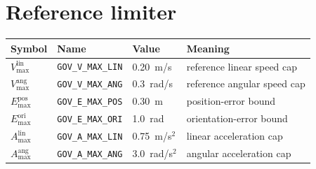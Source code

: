 \documentclass[12pt,a4paper,twoside,openright]{report}
\begin{document}
\section{Reference limiter}
\begin{tabularx}{\linewidth}{@{}lllX@{}}
\toprule
Symbol & Name & Value & Meaning \\
\midrule
$V_{\max}^{\text{lin}}$ & \texttt{GOV\_V\_MAX\_LIN} & 0.20~m/s & reference linear speed cap \\
$V_{\max}^{\text{ang}}$ & \texttt{GOV\_V\_MAX\_ANG} & 0.3~rad/s & reference angular speed cap \\
$E_{\max}^{\text{pos}}$ & \texttt{GOV\_E\_MAX\_POS} & 0.30~m & position-error bound \\
$E_{\max}^{\text{ori}}$ & \texttt{GOV\_E\_MAX\_ORI} & 1.0~rad & orientation-error bound \\
$A_{\max}^{\text{lin}}$ & \texttt{GOV\_A\_MAX\_LIN} & 0.75~m/s$^2$ & linear acceleration cap \\
$A_{\max}^{\text{ang}}$ & \texttt{GOV\_A\_MAX\_ANG} & 3.0~rad/s$^2$ & angular acceleration cap \\
\bottomrule
\end{tabularx}
\end{document}
